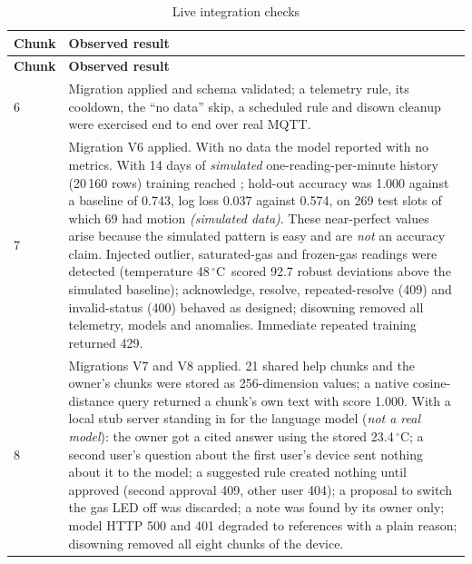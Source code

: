 \documentclass[12pt,a4paper,oneside]{report}
\newcommand{\code}[1]{\texttt{\detokenize{#1}}}
\newcommand{\degC}{$^{\circ}$C}
\newcommand{\simulated}{\textit{(simulated data)}}
\begin{document}
\begin{longtable}{@{}p{2.3cm}p{12.3cm}@{}}
\caption{Live integration checks}\label{tab:live}\\
\toprule
\textbf{Chunk} & \textbf{Observed result}\\
\midrule
\endfirsthead
\toprule
\textbf{Chunk} & \textbf{Observed result}\\
\midrule
\endhead
6 & Migration applied and schema validated; a telemetry rule, its cooldown, the ``no data'' skip, a scheduled rule and disown cleanup were exercised end to end over real MQTT.\\
7 & Migration V6 applied. With no data the model reported \code{INSUFFICIENT_DATA} with no metrics. With 14 days of \emph{simulated} one-reading-per-minute history (20\,160 rows) training reached \code{READY}; hold-out accuracy was 1.000 against a baseline of 0.743, log loss 0.037 against 0.574, on 269 test slots of which 69 had motion \simulated. These near-perfect values arise because the simulated pattern is easy and are \emph{not} an accuracy claim. Injected outlier, saturated-gas and frozen-gas readings were detected (temperature 48\,\degC\ scored 92.7 robust deviations above the simulated baseline); acknowledge, resolve, repeated-resolve (409) and invalid-status (400) behaved as designed; disowning removed all telemetry, models and anomalies. Immediate repeated training returned 429.\\
8 & Migrations V7 and V8 applied. 21 shared help chunks and the owner's chunks were stored as 256-dimension \code{vector} values; a native cosine-distance query returned a chunk's own text with score 1.000. With a local stub server standing in for the language model (\emph{not a real model}): the owner got a cited answer using the stored 23.4\,\degC; a second user's question about the first user's device sent nothing about it to the model; a suggested rule created nothing until approved (second approval 409, other user 404); a proposal to switch the gas LED off was discarded; a note was found by its owner only; model HTTP 500 and 401 degraded to references with a plain reason; disowning removed all eight chunks of the device.\\

\end{longtable}
\end{document}
